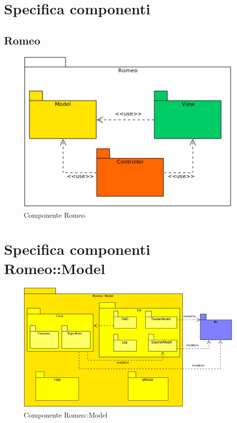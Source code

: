 
\section{Specifica componenti}
\label{componenenti}
\subsection{Romeo}
\label{romeo}
\begin{figure} [!h]
\centering
	\includegraphics[scale=0.65] {../Specifica_Tecnica/Content/Immagini/Romeo.png}
			\caption{Componente Romeo}
			\label{romeoj}
\end{figure}

\section{Specifica componenti Romeo::Model}
\label{specificaModel}

\begin{figure} [!h]
\centering
	\includegraphics[scale=0.65] {../Specifica_Tecnica/Content/Immagini/Romeo__Model.png}
			\caption{Componente Romeo::Model}
			\label{comp_romeo_model}
\end{figure}

